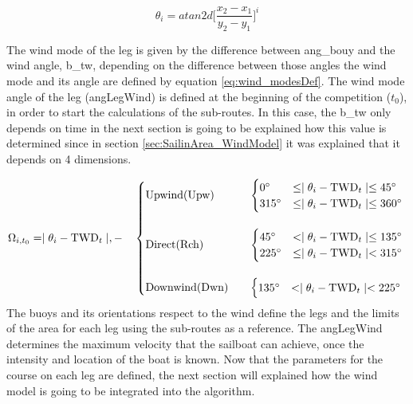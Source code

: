 \begin{equation} \label{eq:bouy_angle}
    \theta_{{i}}=atan2d \bigg [\frac{x_{2}-x_{1}}{y_{2}-y_{1}} \bigg] ^{i}
\end{equation}

The wind mode of the leg is given by the difference between %
\acrshort{ang_bouy} %
and the wind angle, %
\acrshort{b_tw}, depending on the difference between those angles the wind mode and its angle are defined by equation \ref{eq:wind_modesDef}. The wind mode angle of the leg (\acrshort{angLegWind}) is defined at the beginning of the competition (\textit{$t_{0}$}), in order to start the calculations of the sub-routes. In this case, %
the \acrshort{b_tw} only depends on time in the next section is going to be explained how this value is determined since in section \ref{sec:SailinArea_WindModel} it was explained that it depends on 4 dimensions.\par 
\begin{equation} \label{eq:wind_modesDef}
\Omega_{i,t_{0}} = \mid \theta_{i}-\textrm{TWD}_{t} \mid,
- \quad 
    \begin{cases}
        \text{Upwind(Upw)} \quad &
            \begin{cases}
                0\degree  &\leq  \mid \theta_{i}-\textrm{TWD}_{t} \mid    \leq    45\degree \\
                315\degree  &\leq    \mid \theta_{i}-\textrm{TWD}_{t} \mid  \leq   360\degree \\
            \end{cases} \\ 
    \\
        \text{Direct(Rch)}\quad &
            \begin{cases}
                45\degree   &<     \mid \theta_{i}-\textrm{TWD}_{t} \mid \leq   135\degree \\
                225\degree &\leq \mid \theta_{i}-\textrm{TWD}_{t} \mid <  315\degree \\
            \end{cases}\\
    \\
        \text{Downwind(Dwn)}\quad &
            \begin{cases}
                135\degree &<  \mid \theta_{i}-\textrm{TWD}_{t} \mid <  225\degree \\
            \end{cases}
            
    \end{cases}\\
\end{equation}
The buoys and its orientations respect to the wind define the legs and the limits of the area for each leg using the sub-routes as a reference. The \acrfull{angLegWind} determines the maximum velocity that the sailboat can achieve, once the intensity and location of the boat is known.  Now that the parameters for the course on each leg are defined, the next section will explained how the wind model is going to be integrated into the algorithm. \par 

